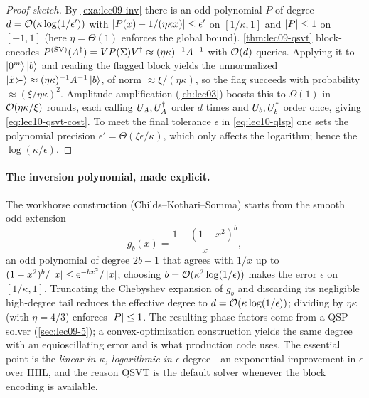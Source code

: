 \begin{proof}[Proof sketch]
By \cref{exa:lec09-inv} there is an odd polynomial $P$ of degree
$d=\mathcal{O}(\kappa\log(1/\epsilon'))$ with $\left\lvert P(x)-1/(\eta\kappa x) \right\rvert\le\epsilon'$ on
$[1/\kappa,1]$ and $\left\lvert P \right\rvert\le1$ on $[-1,1]$ (here $\eta=\Theta(1)$ enforces the global
bound). \cref{thm:lec09-qsvt} block-encodes $P^{(\mathrm{SV})}(A^{\dagger})=VP(\Sigma)V^{\dagger}
\approx(\eta\kappa)^{-1}A^{-1}$ with $\mathcal{O}(d)$ queries. Applying it to $\ket{0^m}\ket b$
and reading the flagged block yields the unnormalized
$\ket{\tilde x\!\succ}\approx(\eta\kappa)^{-1}A^{-1}\ket b$, of norm
$\approx\xi/(\eta\kappa)$, so the flag succeeds with probability $\approx(\xi/\eta\kappa)^2$.
Amplitude amplification (\cref{ch:lec03}) boosts this to $\Omega(1)$ in
$\mathcal{O}(\eta\kappa/\xi)$ rounds, each calling $U_A,U_A^{\dagger}$ order $d$ times and $U_b,U_b^{\dagger}$
order once, giving \eqref{eq:lec10-qsvt-cost}. To meet the final tolerance $\epsilon$ in
\eqref{eq:lec10-qlsp} one sets the polynomial precision $\epsilon'=\Theta(\xi\epsilon/\kappa)$,
which only affects the logarithm; hence the $\log(\kappa/\epsilon)$.
\end{proof}

\paragraph{The inversion polynomial, made explicit.}
The workhorse construction (Childs--Kothari--Somma) starts from the smooth odd extension
\begin{equation}
  g_b(x)=\frac{1-(1-x^2)^{b}}{x},
  \label{eq:lec10-cks}
\end{equation}
an odd polynomial of degree $2b-1$ that agrees with $1/x$ up to
$(1-x^2)^b/\left\lvert x \right\rvert\le\mathrm{e}^{-bx^2}/\left\lvert x \right\rvert$; choosing $b=\mathcal{O}(\kappa^2\log(1/\epsilon))$
makes the error $\epsilon$ on $[1/\kappa,1]$. Truncating the Chebyshev expansion of
$g_b$ and discarding its negligible high-degree tail reduces the effective degree to
$d=\mathcal{O}(\kappa\log(1/\epsilon))$; dividing by $\eta\kappa$ (with $\eta=4/3$) enforces
$\left\lvert P \right\rvert\le1$. The resulting phase factors come from a QSP solver
(\cref{sec:lec09-5}); a convex-optimization construction yields the same degree with an
equioscillating error and is what production code uses. The essential point is the
\emph{linear-in-$\kappa$, logarithmic-in-$\epsilon$} degree---an exponential improvement
in $\epsilon$ over HHL, and the reason QSVT is the default solver whenever the block
encoding is available.

